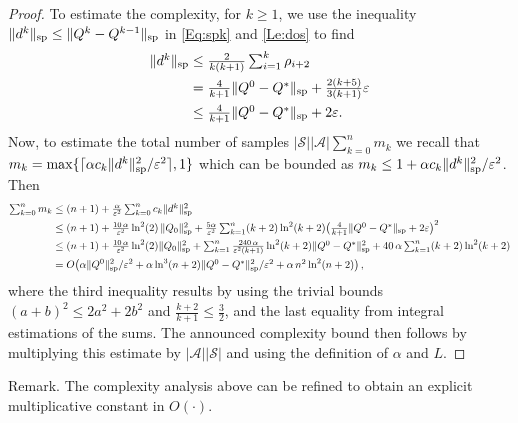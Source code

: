 \documentclass{article}
\newcommand{\cA}{\mathcal{A}}
\newcommand{\cS}{\mathcal{S}}
\renewcommand{\sp}[1]{\|{#1}\|_\text{\rm sp}}
\theoremstyle{plain}
\theoremstyle{definition}
\theoremstyle{remark}
\begin{document}
\begin{proof}
To estimate the complexity, for $k \ge 1$, we use the inequality $\sp{d^k}\le\sp{Q^k-Q^{k-1}}$ in \eqref{Eq:spk} and \cref{Le:dos} to find
\begin{align*}
    \mbox{$\sp{d^k}$}&\leq\mbox{$\frac{2}{k(k+1)}\sum_{i=1}^{k}\rho_{i+2}$}\\
    &=\mbox{$\frac{4}{k+1}\sp{Q^0-Q^*}$} +\mbox{$\frac{2(k+5)}{3(k+1)}\varepsilon$}\\
    &\leq \mbox{$\frac{4}{k+1}\sp{Q^0-Q^*}+2\varepsilon$}.
\end{align*}
Now, to estimate the total number of samples $|\cS||\cA|\sum_{k=0}^n m_k$ 
we recall that $m_k=\max\{\lceil\alpha c_k\sp{d^{k}}^2/\varepsilon^{2}\rceil,1\}$ which can be bounded as $m_k\leq 1+\alpha c_k\sp{d^{k}}^2/\varepsilon^{2}$. Then 
\begin{align}   \mbox{$\sum_{k=0}^nm_k$}&\leq\mbox{$ (n+1)+\frac{\alpha}{\varepsilon^{2}}\sum_{k=0}^n c_k\sp{d^{k}}^2$} \nonumber\\
   &\leq\mbox{$ (n+1)+\frac{10\, \alpha}{\varepsilon^{2}} \ln^2(2)\,\sp{Q_0}^2+\frac{5\alpha}{\varepsilon^{2}}\sum_{k=1}^n (k+2)\ln^2(k+2)\big(\frac{4}{k+1}\sp{Q^0-Q^*}+2\varepsilon\big)^2$} \nonumber\\
      &\leq\mbox{$ (n+1)+\frac{10\, \alpha}{\varepsilon^{2}} \ln^2(2)\sp{Q_0}^2+\sum_{k=1}^n\frac{240\,\alpha}{\varepsilon^{2}(k+1)}\ln^2(k+2)\sp{Q^0-Q^*}^2+40\,\alpha\sum_{k=1}^n(k+2)\ln^2(k+2)$} \nonumber\\
   &=O\!\left( \alpha \sp{Q^0}^2/\varepsilon^{2}+\mbox{$\alpha\ln^3(n+2)\sp{Q^0-Q^*}^2/\varepsilon^{2}+\alpha \,n^2\ln^2(n+2)$}\right),
   \label{eq:last}
\end{align}
where the third inequality results by using the trivial bounds $(a+b)^2\leq2a^2+2b^2$ and $\frac{k+2}{k+1}\leq\frac{3}{2}$,
and the last equality from integral estimations of the sums.
The announced complexity bound then follows by multiplying this estimate by $|\cA||\cS|$ and using the definition 
of $\alpha$ and $L$.
\end{proof}

{\sc Remark.} The complexity analysis above can be refined 
to obtain an explicit multiplicative constant in $O(\cdot)$.
\end{document}
